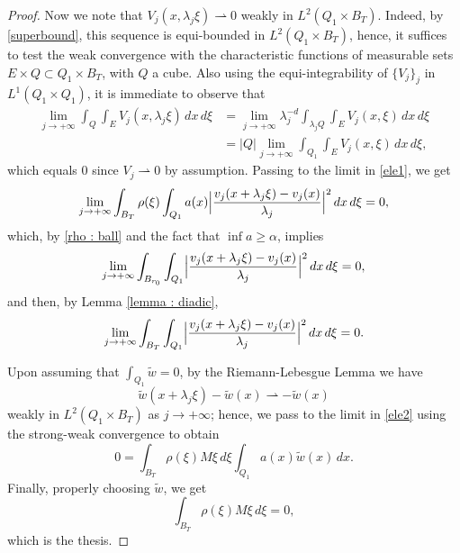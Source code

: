 \documentclass{article}
\theoremstyle{definition}
\begin{document}
\begin{proof}
Now we note that $V_j(x,\lambda_j\xi)\rightharpoonup 0$ weakly in $L^2(Q_1\times B_T)$. Indeed, by \eqref{superbound}, this sequence is equi-bounded in $L^2(Q_1\times B_T)$, hence, it suffices to test the weak convergence with the characteristic functions of measurable sets $E\times Q\subset Q_1\times B_T$, with $Q$ a cube. Also using the equi-integrability of $\{V_j\}_j$ in $L^1(Q_1\times Q_1)$, it is immediate to observe that
\begin{align*}
    \lim_{j\to+\infty} \int_Q\int_E V_j(x,\lambda_j\xi)\,dx\,d\xi & =  \lim_{j\to+\infty} \lambda_j^{-d}\int_{\lambda_jQ}\int_E V_j(x,\xi)\,dx\,d\xi \\
    & = |Q|\lim_{j\to+\infty} \int_{Q_1}\int_E V_j(x,\xi)\,dx\,d\xi,
\end{align*}
which equals $0$ since $V_j\rightharpoonup 0$ by assumption. Passing to the limit in \eqref{ele1}, we get 
\begin{equation*}
   \lim_{j\to+\infty} \int_{B_T} \rho(\xi)\int_{Q_1} a(x)\Bigl|\frac{v_j(x+\lambda_j\xi)-v_j(x)}{\lambda_j}\Bigr|^2\, dx\,d\xi = 0,
\end{equation*}
which, by \eqref{rho : ball} and the fact that $\inf a\geq \alpha$, implies
\begin{equation*}
   \lim_{j\to+\infty} \int_{B_{r_0}} \int_{Q_1} \Bigl|\frac{v_j(x+\lambda_j\xi)-v_j(x)}{\lambda_j}\Bigr|^2\, dx\,d\xi = 0,
\end{equation*}
and then, by Lemma \ref{lemma : diadic},
\begin{equation*}
   \lim_{j\to+\infty} \int_{B_T} \int_{Q_1} \Bigl|\frac{v_j(x+\lambda_j\xi)-v_j(x)}{\lambda_j}\Bigr|^2\, dx\,d\xi = 0.
\end{equation*}

Upon assuming that $\int_{Q_1}\widetilde{w}=0$, by the Riemann-Lebesgue Lemma we have 
\begin{equation*}
    \widetilde{w}(x+\lambda_j\xi)-\widetilde{w}(x)\rightharpoonup -\widetilde{w}(x)
\end{equation*}
weakly in $L^2(Q_1\times B_T)$ as $j\to+\infty$; hence, we pass to the limit in \eqref{ele2} using the strong-weak convergence to obtain
\begin{equation*}
    0 =\int_{B_T} \rho(\xi)M\xi\,d\xi\int_{Q_1} a(x)\widetilde{w}(x)\, dx. 
\end{equation*}
Finally, properly choosing $\widetilde{w}$, we get
\begin{equation*}
    \int_{B_T} \rho(\xi)M\xi\,d\xi=0,
\end{equation*}
which is the thesis.
\end{proof}
\end{document}
